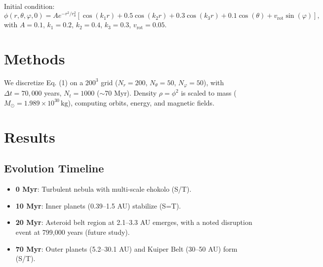 \documentclass[11pt]{article}
\begin{document}
Initial condition:
\begin{equation}
\phi(r, \theta, \varphi, 0) = A e^{-r^2 / r_0^2} \left[ \cos(k_1 r) + 0.5 \cos(k_2 r) + 0.3 \cos(k_3 r) + 0.1 \cos(\theta) + v_{\text{rot}} \sin(\varphi) \right],
\end{equation}
with \(A = 0.1\), \(k_1 = 0.2\), \(k_2 = 0.4\), \(k_3 = 0.3\), \(v_{\text{rot}} = 0.05\).

\section{Methods}
We discretize Eq. (1) on a $200^3$ grid (\(N_r = 200\), \(N_\theta = 50\), \(N_\varphi = 50\)), with \(\Delta t = 70,000\) years, \(N_t = 1000\) (\(\sim\)70 Myr). Density \(\rho = \phi^2\) is scaled to mass (\(M_\odot = 1.989 \times 10^{30} \, \text{kg}\)), computing orbits, energy, and magnetic fields.

\section{Results}
\subsection{Evolution Timeline}
\begin{itemize}
    \item \textbf{0 Myr}: Turbulent nebula with multi-scale ehokolo (S/T).
    \item \textbf{10 Myr}: Inner planets (0.39--1.5 AU) stabilize (S=T).
    \item \textbf{20 Myr}: Asteroid belt region at 2.1--3.3 AU emerges, with a noted disruption event at 799,000 years (future study).
    \item \textbf{70 Myr}: Outer planets (5.2--30.1 AU) and Kuiper Belt (30--50 AU) form (S/T).
\end{itemize}
\end{document}
